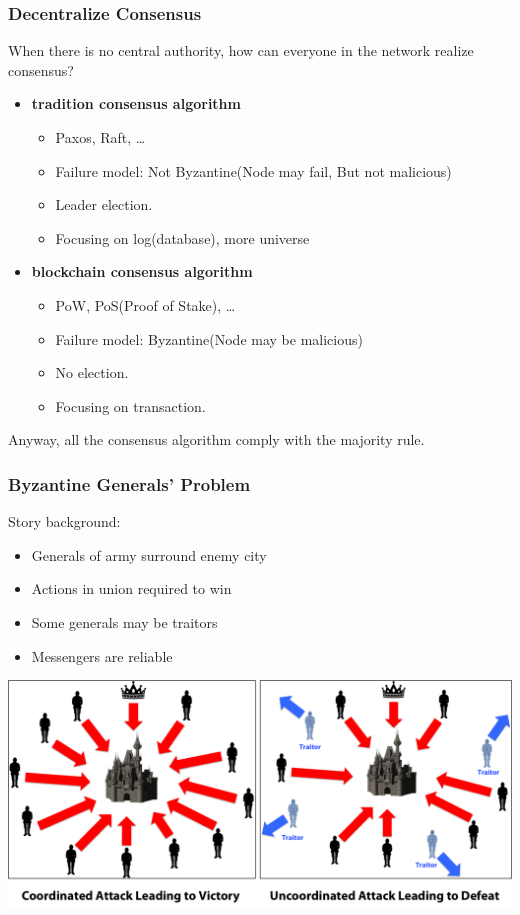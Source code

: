 \begin{frame}
    \frametitle{Decentralize Consensus}
    When there is no central authority, how can everyone in the network realize consensus?
    \begin{itemize}
        \item \textbf{tradition consensus algorithm}
            \begin{itemize}
                \item Paxos, Raft, \ldots
                \item Failure model: Not Byzantine(Node may fail, But not malicious)
                \item Leader election.
                \item Focusing on log(database), more universe
            \end{itemize}
        \item \textbf{blockchain consensus algorithm}
            \begin{itemize}
                \item PoW, PoS(Proof of Stake), \ldots
                \item Failure model: Byzantine(Node may be malicious)
                \item No election.
                \item Focusing on transaction.
            \end{itemize}
    \end{itemize}
    Anyway, all the consensus algorithm comply with the \alert{majority rule}.
\end{frame}

\begin{frame}
    \frametitle{Byzantine Generals' Problem}
    Story background:
    \begin{itemize}
        \item Generals of army surround enemy city
        \item Actions in union required to win
        \item Some generals may be traitors
        \item Messengers are reliable
    \end{itemize}
    \begin{center}
        \includegraphics[scale=0.15]{./figures/byzantine-generals-problem.png}
    \end{center}
\end{frame}

